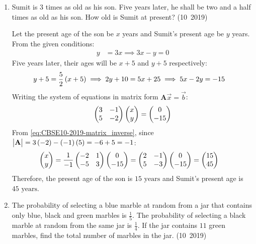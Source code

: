 \begin{enumerate}[label=\thesubsection.\arabic*, ref=\thesubsection.\theenumi]
	\item Sumit is $3$ times as old as his son. Five years later, he shall be two and a half times as old as his son. How old is Sumit at present?
	\hfill (10~2019)
	
	\solution
	Let the present age of the son be $x$ years and Sumit's present age be $y$ years.
	From the given conditions:
	\begin{align}
		y &= 3x \implies 3x - y = 0 \label{eq:EE26BTECH11223-10-q12-eq1}
	\end{align}
	Five years later, their ages will be $x + 5$ and $y + 5$ respectively:
	\begin{align}
		y + 5 &= \frac{5}{2}\left(x + 5\right) \implies 2y + 10 = 5x + 25 \implies 5x - 2y = -15 \label{eq:EE26BTECH11223-10-q12-eq2}
	\end{align}
	Writing the system of equations in matrix form $\mathbf{A}\vec{x} = \vec{b}$:
	\begin{align}
		\begin{pmatrix}3 & -1 \\ 5 & -2\end{pmatrix}\begin{pmatrix}x \\ y\end{pmatrix} = \begin{pmatrix}0 \\ -15\end{pmatrix}
	\end{align}
	From \eqref{eq:CBSE10-2019-matrix_inverse}, since $\begin{vmatrix}\mathbf{A}\end{vmatrix} = 3\left(-2\right) - \left(-1\right)\left(5\right) = -6 + 5 = -1$:
	\begin{align}
		\begin{pmatrix}x \\ y\end{pmatrix} &= \frac{1}{-1}\begin{pmatrix}-2 & 1 \\ -5 & 3\end{pmatrix}\begin{pmatrix}0 \\ -15\end{pmatrix} = \begin{pmatrix}2 & -1 \\ 5 & -3\end{pmatrix}\begin{pmatrix}0 \\ -15\end{pmatrix} = \begin{pmatrix}15 \\ 45\end{pmatrix}
	\end{align}
	Therefore, the present age of the son is $15\text{ years}$ and Sumit's present age is $45\text{ years}$.
	
	\item The probability of selecting a blue marble at random from a jar that contains only blue, black and green marbles is $\frac{1}{5}$. The probability of selecting a black marble at random from the same jar is $\frac{1}{4}$. If the jar contains $11$ green marbles, find the total number of marbles in the jar.
	\hfill (10~2019)
	

\end{enumerate}
